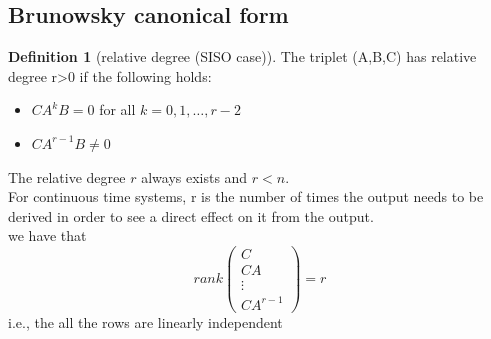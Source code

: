 \documentclass{book}
\theoremstyle{definition}
\newtheorem{definition}{Definition}[section]
\theoremstyle{remark}
\theoremstyle{remark}
\begin{document}
\subsection{Brunowsky canonical form}
\begin{definition}[relative degree (SISO case)]
    The triplet (A,B,C) has relative degree r>0 if the following holds:
    \begin{itemize}
        \item $CA^kB=0$ for all $k=0,1,\dots,r-2$
        \item $CA^{r-1}B \neq 0$
    \end{itemize}
\end{definition}
The relative degree $r$ always exists and $r<n$.\\
For continuous time systems, r is the number of times the output needs to be derived in order to see a direct effect on it from the output. \\
we have that \[
rank\begin{pmatrix}
    C\\CA\\\vdots\\CA^{r-1}
\end{pmatrix}=r
\]
i.e., the all the rows are linearly independent
\end{document}
